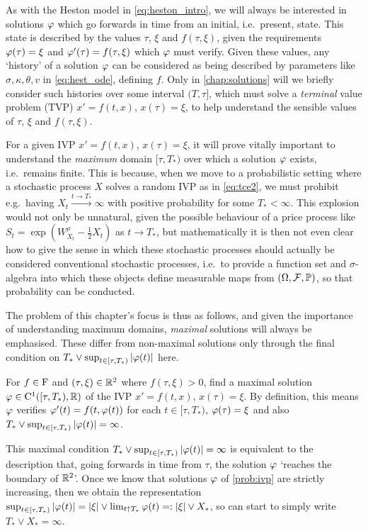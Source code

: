 As with the Heston model in \autoref{eq:heston_intro}, we will always be interested in solutions $\varphi$ which go forwards in time from an initial, i.e.~present, state. This state is described by the values $\tau$, $\xi$ and $f(\tau,\xi)$, given the requirements $\varphi(\tau)=\xi$ and $\varphi'(\tau)=f(\tau,\xi)$ which $\varphi$ must verify. Given these values, any `history' of a solution $\varphi$ can be considered as being described by parameters like $\sigma,\kappa,\theta,v$ in \autoref{eq:hest_ode}, defining $f$. Only in \autoref{chap:solutions} will we briefly consider such histories over some interval $(T,\tau]$, which must solve a \emph{terminal} value problem (TVP) $x'=f(t,x)$, $x(\tau)=\xi$, to help understand the sensible values of $\tau$, $\xi$ and $f(\tau,\xi)$.

For a given IVP $x'=f(t,x)$, $x(\tau)=\xi$, it will prove vitally important to understand the \emph{maximum} domain $[\tau,T_*)$ over which a solution $\varphi$ exists, i.e.~remains finite. This is because, when we move to a probabilistic setting where a stochastic process $X$ solves a random IVP as in \autoref{eq:tce2}, we must prohibit e.g.~having $X_t\xrightarrow{t\to T_*}\infty$ with positive probability for some $T_*<\infty$. This explosion would not only be unnatural, given the possible behaviour of a price process like $S_t=\exp(W^\rho_{X_t} - \frac12 X_t)$ as $t\to T_*$, but mathematically it is then not even clear how to give the sense in which these stochastic processes should actually be considered conventional stochastic processes, i.e.~to provide a function set and $\sigma$-algebra into which these objects define measurable maps from $(\Omega,\mathcal{F},\mathbb{P})$, so that probability can be conducted.

The problem of this chapter's focus is thus as follows, and given the importance of understanding maximum domains, \emph{maximal} solutions will always be emphasised. These differ from non-maximal solutions only through the final condition on $T_*\vee\sup_{t\in[\tau,T_*)}|\varphi(t)|$ here.
\begin{problem}\label{prob:ivp}
    For $f\in \mathrm{F}$ and $(\tau,\xi)\in\mathbb{R}^2$ where $f(\tau,\xi)>0$, find a maximal solution $\varphi\in\mathrm{C}^1([\tau,T_*),\mathbb{R})$ of the IVP $x'=f(t,x)$, $x(\tau)=\xi$. By definition, this means $\varphi$ verifies $\varphi'(t)=f(t,\varphi(t))$ for each $t\in[\tau,T_*)$, $\varphi(\tau)=\xi$ and also $T_*\vee\sup_{t\in[\tau,T_*)}|\varphi(t)|=\infty$.
\end{problem}

This maximal condition $T_*\vee\sup_{t\in[\tau,T_*)}|\varphi(t)|=\infty$ is equivalent to the description that, going forwards in time from $\tau$, the solution $\varphi$ `reaches the boundary of $\mathbb{R}^2$'. Once we know that solutions $\varphi$ of \autoref{prob:ivp} are strictly increasing, then we obtain the representation $\sup_{t\in[\tau,T_*)}|\varphi(t)|=|\xi|\vee\lim_{t\uparrow T_*}\varphi(t)=:|\xi|\vee X_*$, so can start to simply write $T_*\vee X_* = \infty$.

